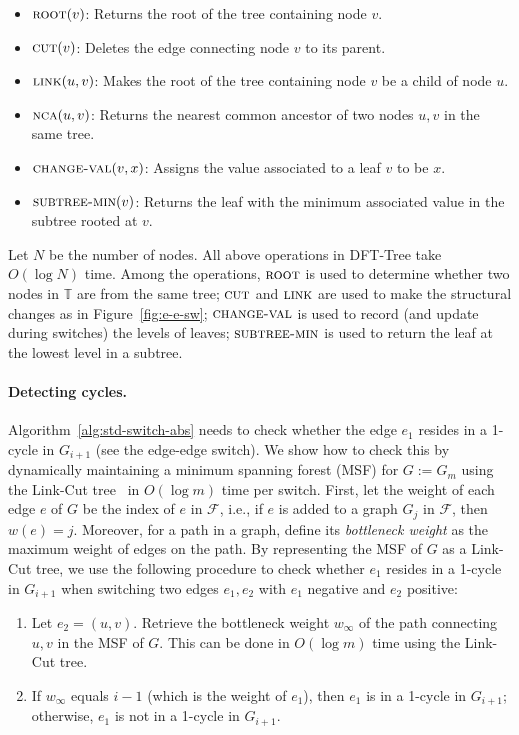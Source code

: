 \documentclass[letterpaper,11pt]{article}
\theoremstyle{mythmstyle}
\theoremstyle{mydefstyle}
\theoremstyle{plain}
\theoremstyle{definition}
\newcommand{\<}[1]{\langle #1\rangle}
\newcommand{\Fcal}{\mathcal{F}}
\newcommand{\Fpo}{\mathbb{T}}
\theoremstyle{definition}
\begin{document}
\begin{itemize}
    \item $\textsc{root}(v)$: Returns the root of the tree containing node $v$.
    \item $\textsc{cut}(v)$: Deletes the edge connecting node $v$ to its parent.
    \item $\textsc{link}(u,v)$: Makes the root of the tree containing node $v$ be a child of node $u$.
    \item $\textsc{nca}(u,v)$: Returns the nearest common ancestor of two nodes $u,v$
    in the same tree.
    \item $\textsc{change-val}(v,x)$: Assigns the value associated to a leaf $v$ to be $x$.
    \item $\textsc{subtree-min}(v)$: Returns the leaf with the minimum associated value in the subtree rooted at $v$.
\end{itemize}

Let $N$ be the number of nodes.
All above operations in DFT-Tree
take $O(\log N)$ time.
Among the operations, $\textsc{root}$ is used to determine whether two nodes in $\Fpo$ are from the same tree;
$\textsc{cut}$ and $\textsc{link}$ are used to make the structural changes as in Figure~\ref{fig:e-e-sw};
$\textsc{change-val}$ is used to record (and update during switches) 
the levels of leaves;
$\textsc{subtree-min}$ is used to return the leaf at the lowest level in a subtree.



\paragraph{Detecting cycles.}



Algorithm~\ref{alg:std-switch-abs}  needs to check whether 
the edge $e_1$ resides in a 1-cycle in $G_{i+1}$ (see the edge-edge switch).
We show how to check this by dynamically maintaining 
a minimum spanning forest (MSF) for $G:=G_m$ using the Link-Cut tree~\cite{sleator1981data}
in $O(\log m)$ time per switch.
First,
let the weight of each edge $e$ of $G$
be the index of $e$ in $\Fcal$,
i.e., if $e$ is added to a graph $G_j$ in $\Fcal$,
then $w(e)=j$.
Moreover,
for a path 
in a graph,
define its \emph{bottleneck weight} as the maximum weight of edges on the path.
By representing the MSF of $G$ as a Link-Cut tree,
we use the following procedure to
check whether 
$e_1$ resides in a 1-cycle in $G_{i+1}$
when switching two edges $e_1,e_2$
with $e_1$ negative and $e_2$ positive:
\begin{enumerate}
    \item 
    Let $e_2=(u,v)$.
    Retrieve the bottleneck weight $w_\infty$ of the path connecting
  $u,v$ in the MSF of $G$.
  This can be done in $O(\log m)$ time
  using the Link-Cut tree.
  \item
  If $w_\infty$ equals $i-1$ (which is the weight of $e_1$), 
  then $e_1$ is in a 1-cycle in $G_{i+1}$;
  otherwise, $e_1$ is not in a 1-cycle in $G_{i+1}$. 
\end{enumerate}
\end{document}
